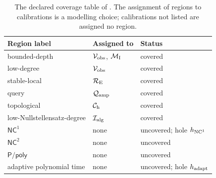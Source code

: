 \begin{table}[H]
  \centering
  \caption{The declared coverage table of .  The assignment of regions to calibrations is a modelling choice; calibrations not listed are assigned no region.}
  \label{tab:coverage-regions}
  \small
  \renewcommand{\arraystretch}{1.08}
  \begin{tabularx}{\textwidth}{@{}>{\raggedright\arraybackslash}p{}>{\raggedright\arraybackslash}X>{\raggedright\arraybackslash}p{}@{}}
    \toprule
    Region label & Assigned to & Status \\
    \midrule
    bounded-depth & \(\mathcal{V}_{\text{obs}}\), \(\mathcal{M}_{\text{I}}\) & covered \\
    low-degree & \(\mathcal{V}_{\text{obs}}\) & covered \\
    stable-local & \(\mathcal{R}_{\text{E}}\) & covered \\
    query & \(\mathcal{Q}_{\text{amp}}\) & covered \\
    topological & \(\mathcal{C}_{\text{h}}\) & covered \\
    low-Nullstellensatz-degree & \(\mathcal{I}_{\text{alg}}\) & covered \\
    \(\mathsf{NC}^{1}\) & none & uncovered; hole \(h_{\mathrm{NC}^{1}}\) \\
    \(\mathsf{NC}^{2}\) & none & uncovered \\
    \(\mathsf{P/poly}\) & none & uncovered \\
    adaptive polynomial time & none & uncovered; hole \(h_{\mathrm{adapt}}\) \\
    \bottomrule
  \end{tabularx}
\end{table}
